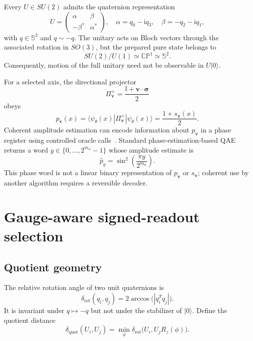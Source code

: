 \documentclass[a4paper,twocolumn,11pt,unpublished]{quantumarticle}
\newcommand{\ii}{\mathrm{i}}
\newcommand{\Id}{\mathbb{I}}
\newcommand{\ket}[1]{|#1\rangle}
\newcommand{\bra}[1]{\langle #1|}
\newcommand{\Sph}{\mathbb{S}}
\newcommand{\pauli}{\boldsymbol{\sigma}}
\newcommand{\axis}{\boldsymbol{v}}
\begin{document}
Every $U\in SU(2)$ admits the quaternion representation
\begin{equation}
U=\begin{pmatrix}\alpha&\beta\\-\beta^*&\alpha^*\end{pmatrix},
\quad
\alpha=q_0-\ii q_3,
\quad
\beta=-q_2-\ii q_1,
\end{equation}
with $q\in\Sph^3$ and $q\sim-q$. The unitary acts on Bloch vectors through the associated rotation in $SO(3)$, but the prepared pure state belongs to
\begin{equation}
SU(2)/U(1)\simeq\mathbb{CP}^{1}\simeq\Sph^2.
\end{equation}
Consequently, motion of the full unitary need not be observable in $U\ket{0}$.

For a selected axis, the directional projector
\begin{equation}
\Pi_{\axis}^{+}=\frac{\Id+\axis\cdot\pauli}{2}
\end{equation}
obeys
\begin{equation}
p_{\axis}(x)=\bra{\psi_\theta(x)}\Pi_{\axis}^{+}\ket{\psi_\theta(x)}
=\frac{1+s_{\axis}(x)}{2}.
\end{equation}
Coherent amplitude estimation can encode information about $p_{\axis}$ in a phase register using controlled oracle calls~\cite{Brassard2002,Rall2021,RallFuller2023}. Standard phase-estimation-based QAE returns a word $y\in\{0,\ldots,2^{m_\phi}-1\}$ whose amplitude estimate is
\begin{equation}
\widehat p_y=\sin^2\!\left(\frac{\pi y}{2^{m_\phi}}\right).
\end{equation}
This phase word is not a linear binary representation of $p_{\axis}$ or $s_{\axis}$; coherent use by another algorithm requires a reversible decoder.

\section{Gauge-aware signed-readout selection}

\subsection{Quotient geometry}

The relative rotation angle of two unit quaternions is
\begin{equation}
\delta_{\mathrm{rot}}(q_i,q_j)
=2\arccos\bigl(|q_i^Tq_j|\bigr).
\end{equation}
It is invariant under $q\mapsto-q$ but not under the stabilizer of $\ket{0}$. Define the quotient distance
\begin{equation}
\delta_{\mathrm{quot}}(U_i,U_j)
=\min_{\phi}\delta_{\mathrm{rot}}\bigl(U_i,U_jR_z(\phi)\bigr).
\end{equation}
\end{document}

